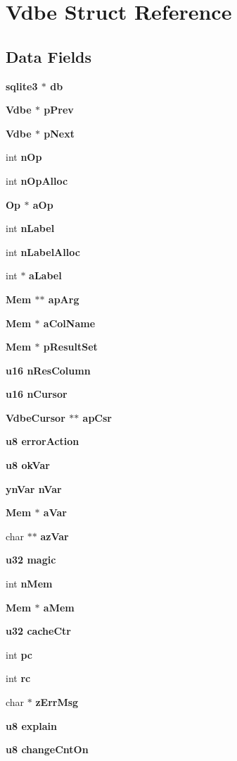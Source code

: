 \section{Vdbe Struct Reference}
\label{structVdbe}
\subsection*{Data Fields}
\begin{CompactItemize}
\item 
\bf{sqlite3} $\ast$ \bf{db}
\item 
\bf{Vdbe} $\ast$ \bf{p\-Prev}
\item 
\bf{Vdbe} $\ast$ \bf{p\-Next}
\item 
int \bf{n\-Op}
\item 
int \bf{n\-Op\-Alloc}
\item 
\bf{Op} $\ast$ \bf{a\-Op}
\item 
int \bf{n\-Label}
\item 
int \bf{n\-Label\-Alloc}
\item 
int $\ast$ \bf{a\-Label}
\item 
\bf{Mem} $\ast$$\ast$ \bf{ap\-Arg}
\item 
\bf{Mem} $\ast$ \bf{a\-Col\-Name}
\item 
\bf{Mem} $\ast$ \bf{p\-Result\-Set}
\item 
\bf{u16} \bf{n\-Res\-Column}
\item 
\bf{u16} \bf{n\-Cursor}
\item 
\bf{Vdbe\-Cursor} $\ast$$\ast$ \bf{ap\-Csr}
\item 
\bf{u8} \bf{error\-Action}
\item 
\bf{u8} \bf{ok\-Var}
\item 
\bf{yn\-Var} \bf{n\-Var}
\item 
\bf{Mem} $\ast$ \bf{a\-Var}
\item 
char $\ast$$\ast$ \bf{az\-Var}
\item 
\bf{u32} \bf{magic}
\item 
int \bf{n\-Mem}
\item 
\bf{Mem} $\ast$ \bf{a\-Mem}
\item 
\bf{u32} \bf{cache\-Ctr}
\item 
int \bf{pc}
\item 
int \bf{rc}
\item 
char $\ast$ \bf{z\-Err\-Msg}
\item 
\bf{u8} \bf{explain}
\item 
\bf{u8} \bf{change\-Cnt\-On}
\item 
$$
\end{CompactItemize}
